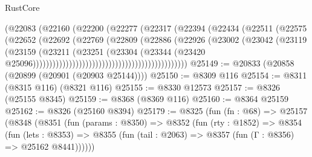 \begin{lexlean}{RustCore}
\begin{coremodule}
                                                  (@22083
                                                    (@22160
                                                      (@22200
                                                        (@22277
                                                          (@22317
                                                            (@22394
                                                              (@22434
                                                                (@22511
                                                                  (@22575
                                                                    (@22652
                                                                      (@22692
                                                                        (@22769
                                                                          (@22809
                                                                            (@22886
                                                                              (@22926
                                                                                (@23002
                                                                                  (@23042
                                                                                    (@23119
                                                                                      (@23159
                                                                                        (@23211
                                                                                          (@23251
                                                                                            (@23304
                                                                                              (@23344
                                                                                                (@23420
                                                                                                  @25096)))))))))))))))))))))))))))))))))))))))))))))))
@25149 := @20833 (@20858 (@20899 (@20901 (@20903 @25144))))
@25150 := @8309 @116
@25154 := @8311 (@8315 @116) (@8321 @116)
@25155 := @8330 @12573
@25157 := @8326 (@25155 @8345)
@25159 := @8368 (@8369 @116)
@25160 := @8364 @25159
@25162 := @8326 (@25160 @8394)
@25179 := @8325
    (fun (fn : @68) =>
    @25157
      (@8348
        (@8351
          (fun (params : @8350) =>
          @8352
            (fun (rty : @1852) =>
            @8354
              (fun (lets : @8353) =>
              @8355 (fun (tail : @2063) => @8357 (fun (Γ : @8356) => @25162 @8441))))))

\end{coremodule}
\end{lexlean}
